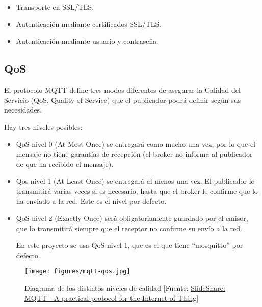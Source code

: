 \begin{itemize}
\item Transporte en SSL/TLS.
\item Autenticación mediante certificados SSL/TLS.
\item Autenticación mediante usuario y contraseña.
\end{itemize}

\subsection{QoS}
El protocolo MQTT define tres modos diferentes de asegurar la Calidad del Servicio (QoS, Quality of Service) que el publicador podrá definir según sus necesidades.

Hay tres niveles posibles:
\begin{itemize}
\item QoS nivel 0 (At Most Once) se entregará como mucho una vez, por lo que el mensaje no tiene garantías de recepción (el broker no informa al publicador de que ha recibido el mensaje).

\item Qos nivel 1 (At Least Once) se entregará al menos una vez. El publicador lo transmitirá varias veces si es necesario, hasta que el broker le confirme que lo ha enviado a la red. Este es el nivel por defecto.

\item QoS nivel 2 (Exactly Once) será obligatoriamente guardado por el emisor, que lo transmitirá siempre que el receptor no confirme su envío a la red.

En este proyecto se usa QoS nivel 1, que es el que tiene ``mosquitto'' por defecto.

\end{itemize}
\begin{figure}[htb]
	\begin{center}
		\texttt{[image: figures/mqtt-qos.jpg]}
		\caption{Diagrama de los distintos niveles de calidad [Fuente: \href{https://image.slidesharecdn.com/0xwitjksqnqruoz4tnsi-signature-6a256d24caf5d1fcc6a3bf1d013dfe0e1fa99369a560d140998f50cbdbc6d127-poli-140828123252-phpapp02/95/mqtt-a-practical-protocol-for-the-internet-of-things-15-638.jpg?cb=1409229409}{SlideShare: MQTT - A practical protocol for the Internet of Thing}] \label{qos}}
	\end{center}
\end{figure}
